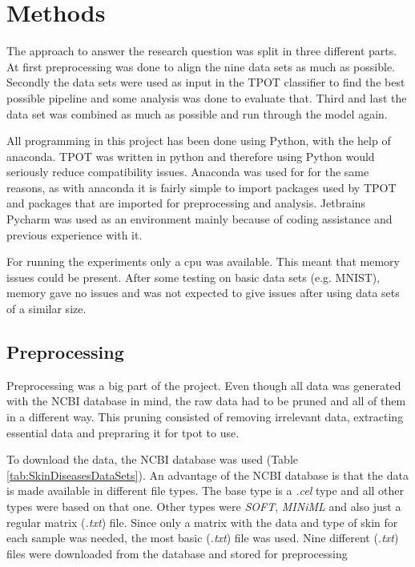 \documentclass[10pt,a4paper]{article}
\begin{document}
	\section{Methods}
	\label{sec:Methods}
	
	The approach to answer the research question was split in three different parts. At first preprocessing was done to align the nine data sets as much as possible. Secondly the data sets were used as input in the TPOT classifier to find the best possible pipeline and some analysis was done to evaluate that. Third and last the data set was combined as much as possible and run through the model again. 
	
	All programming in this project has been done using Python, with the help of anaconda. TPOT was written in python and therefore using Python would seriously reduce compatibility issues. Anaconda was used for for the same reasons, as with anaconda it is fairly simple to import packages used by TPOT and packages that are imported for preprocessing and analysis. Jetbrains Pycharm was used as an environment mainly because of coding assistance and previous experience with it.
	
	
	For running the experiments only a cpu was available. This meant that memory issues could be present. After some testing on basic data sets (e.g. MNIST), memory gave no issues and was not expected to give issues after using data sets of a similar size.
	
	\subsection{Preprocessing}
	\label{subsec:Preprocessing}
	
	Preprocessing was a big part of the project. Even though all data was generated with the NCBI database\cite{edgar2002gene} in mind, the raw data had to be pruned and all of them in a different way. This pruning consisted of removing irrelevant data, extracting essential data and prepraring it for tpot to use. 
	
	To download the data, the NCBI database was used (Table \ref{tab:SkinDiseasesDataSets}).  An advantage of the NCBI database is that the data is made available in different file types. The base type is a  \textit{.cel} type and all other types were based on that one. Other types were \textit{SOFT}, \textit{MINiML} and also just a regular matrix (\textit{.txt}) file. Since only a matrix with the data and type of skin for each sample was needed, the most basic (\textit{.txt}) file was used. Nine different (\textit{.txt}) files were downloaded from the database and stored for preprocessing
	
\end{document}
